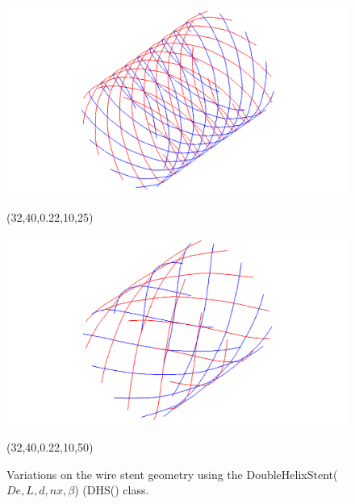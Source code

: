 \begin{figure} [ht]
\begin{latexonly}
\begin{minipage} [c] [] [c]{5.5cm}
	\includegraphics [width =\textwidth] {images/WireStentD32L40d22n10b25}
	\begin{center}
	\vspace{-3ex}
	(32,40,0.22,10,25)
	\vspace{1ex}
	\end{center}
\end{minipage}
\hspace{0.3cm}
\begin{minipage} [c] [] [c] {5.5cm}
	\includegraphics [width =\textwidth] {images/WireStentD32L40d22n10b50}
	\begin{center}
	\vspace{-3ex}
	(32,40,0.22,10,50)
	\vspace{1ex}
	\end{center}
\end{minipage}
\hspace{0.3cm}
   \end{latexonly}
   \begin{htmlonly}
   \end{htmlonly} 
	\caption {Variations on the wire stent geometry using the DoubleHelixStent($De,L,d,nx,\beta$) (DHS() class.} 
	\label{param} 	
\end{figure}

